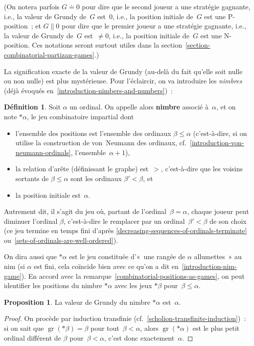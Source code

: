 \documentclass[12pt,a4paper]{article}
\theoremstyle{definition}
\newtheorem{defn}[comcnt]{Définition}
\newtheorem{prop}[comcnt]{Proposition}
\newcommand{\gr}{\operatorname{gr}}
\newcommand{\fuzzy}{\mathrel{\|}}
\newcommand{\defin}[2][]{\def\latexsucks{#1}\ifx\latexsucks\empty\index{#2}\else\index{\latexsucks}\fi\textbf{#2}}
\begin{document}
(On notera parfois $G\doteq 0$ pour dire que le second joueur a une
stratégie gagnante, i.e., la valeur de Grundy de $G$ est $0$, i.e., la
position initiale de $G$ est une P-position ; et $G\fuzzy 0$ pour dire
que le premier joueur a une stratégie gagnante, i.e., la valeur de
Grundy de $G$ est $\neq 0$, i.e., la position initiale de $G$ est une
N-position.  Ces notations seront surtout utiles dans la
section \ref{section-combinatorial-partizan-games}.)

La signification exacte de la valeur de Grundy (au-delà du fait
qu'elle soit nulle ou non nulle) est plus mystérieuse.  Pour
l'éclaircir, on va introduire les \emph{nimbres} (déjà évoqués
en \ref{introduction-nimbers-and-numbers}) :

\begin{defn}\label{definition-nimber}
Soit $\alpha$ un ordinal.  On appelle alors \defin{nimbre} associé
à $\alpha$, et on note $*\alpha$, le jeu combinatoire impartial dont
\begin{itemize}
\item l'ensemble des positions est l'ensemble des ordinaux $\beta \leq
  \alpha$ (c'est-à-dire, si on utilise la construction de von Neumann
  des ordinaux, cf. \ref{introduction-von-neumann-ordinals},
  l'ensemble $\alpha+1$),
\item la relation d'arête (définissant le graphe) est $>$,
  c'est-à-dire que les voisins sortants de $\beta\leq\alpha$ sont les
  ordinaux $\beta'<\beta$, et
\item la position initiale est $\alpha$.
\end{itemize}
Autrement dit, il s'agit du jeu où, partant de l'ordinal $\beta =
\alpha$, chaque joueur peut diminuer l'ordinal $\beta$, c'est-à-dire
le remplacer par un ordinal $\beta' < \beta$ de son choix (ce jeu
termine en temps fini d'après
\ref{decreasing-sequences-of-ordinals-terminate}
ou \ref{sets-of-ordinals-are-well-ordered}).

On dira aussi que $*\alpha$ est le jeu constituée d'« une rangée de
  $\alpha$ allumettes » au nim (si $\alpha$ est fini, cela coïncide
bien avec ce qu'on a dit en \ref{introduction-nim-game}).  En accord
avec la remarque \ref{combinatorial-positions-as-games}, on peut
identifier les positions du nimbre $*\alpha$ avec les jeux $*\beta$
pour $\beta\leq\alpha$.
\end{defn}

\begin{prop}\label{grundy-of-nimbers-triviality}
La valeur de Grundy du nimbre $*\alpha$ est $\alpha$.
\end{prop}
\begin{proof}
On procède par induction transfinie
(cf. \ref{scholion-transfinite-induction}) : si on sait que
$\gr(*\beta) = \beta$ pour tout $\beta<\alpha$, alors
$\gr(*\alpha)$ est le plus petit ordinal différent de $\beta$
pour $\beta<\alpha$, c'est donc exactement $\alpha$.
\end{proof}
\end{document}
